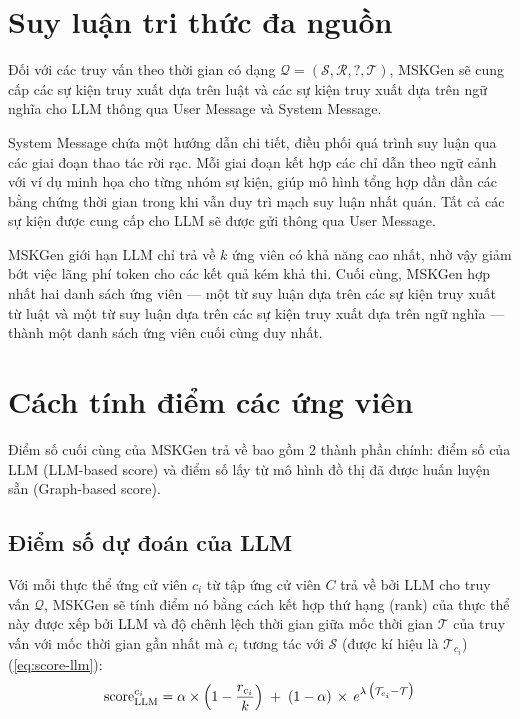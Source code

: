 \vspace{1em}
\section{Suy luận tri thức đa nguồn}
Đối với các truy vấn theo thời gian có dạng $\mathcal{Q = (S, R, ?, T)}$, MSKGen sẽ cung cấp các sự kiện truy xuất dựa trên luật và các sự kiện truy xuất dựa trên ngữ nghĩa cho LLM thông qua User Message và System Message.

System Message chứa một hướng dẫn chi tiết, điều phối quá trình suy luận qua các giai đoạn thao tác rời rạc. Mỗi giai đoạn kết hợp các chỉ dẫn theo ngữ cảnh với ví dụ minh họa cho từng nhóm sự kiện, giúp mô hình tổng hợp dần dần các bằng chứng thời gian trong khi vẫn duy trì mạch suy luận nhất quán. Tất cả các sự kiện được cung cấp cho LLM sẽ được gửi thông qua User Message.

MSKGen giới hạn LLM chỉ trả về $k$ ứng viên có khả năng cao nhất, nhờ vậy giảm bớt việc lãng phí token cho các kết quả kém khả thi. Cuối cùng, MSKGen hợp nhất hai danh sách ứng viên — một từ suy luận dựa trên các sự kiện truy xuất từ luật và một từ suy luận dựa trên các sự kiện truy xuất dựa trên ngữ nghĩa — thành một danh sách ứng viên cuối cùng duy nhất.

\vspace{1em}
\section{Cách tính điểm các ứng viên}

Điểm số cuối cùng của MSKGen trả về bao gồm 2 thành phần chính: điểm số của LLM (LLM-based score) và điểm số lấy từ mô hình đồ thị đã được huấn luyện sẵn (Graph-based score).

\vspace{1em}
\subsection{Điểm số dự đoán của LLM}

Với mỗi thực thể ứng cử viên $c_i$ từ tập ứng cử viên $C$ trả về bởi LLM cho truy vấn $\mathcal{Q}$, MSKGen sẽ tính điểm nó bằng cách kết hợp thứ hạng (rank) của thực thể này được xếp bởi LLM và độ chênh lệch thời gian giữa mốc thời gian $\mathcal{T}$ của truy vấn với mốc thời gian gần nhất mà $c_i$ tương tác với $\mathcal{S}$ (được kí hiệu là $\mathcal{T}_{c_i}$) (\ref{eq:score-llm}):
\begin{equation}  
\label{eq:score-llm}  
\text{score}^{c_i}_{\text{LLM}}   
= \alpha \times \Bigl(1 - \frac{r_{c_i}}{k}\Bigr)  
\;+\; (1 - \alpha)\,\times\, e^{\lambda \,\bigl(\mathcal{T}_{c_i} - \mathcal{T}\bigr)}   
\end{equation}


